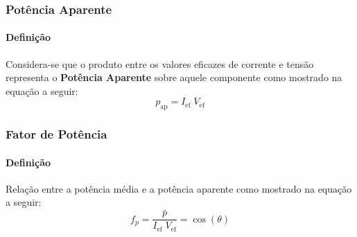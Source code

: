 \documentclass{article}
\begin{document}
            \subsubsection{Potência Aparente}
                \paragraph{Definição}Considera-se que o produto entre os valores eficazes de corrente e tensão representa o \textbf{Potência Aparente} sobre aquele componente como mostrado na equação a seguir:
                    \begin{equation}
                        \boxed{p_{\text{ap}} = I_{\text{ef}}\;V_{\text{ef}}}
                    \end{equation}

            \subsubsection{Fator de Potência}
                \paragraph{Definição}Relação entre a potência média e a potência aparente como mostrado na equação a seguir:
                    \begin{equation}
                        \boxed{
                            f_{p} = \frac{\bar{p}}{I_{\text{ef}}\;V_{\text{ef}}} = \cos(\theta)
                        }
                    \end{equation}
\end{document}
